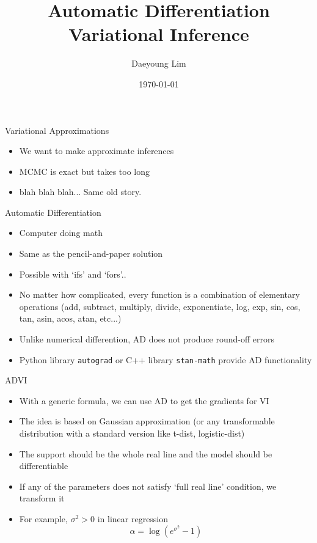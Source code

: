 \documentclass[color=usernames,dvipsnames]{beamer}
\title{Automatic Differentiation Variational Inference}
\author{Daeyoung Lim}
\institute{Department of Statistics\\Korea University}
\date{\today}
\begin{document}
	\frame{\titlepage}
	\begin{frame}{Variational Approximations}
    \begin{itemize}
      \item<+-> We want to make approximate inferences
      \item<+-> MCMC is exact but takes too long
      \item<+-> blah blah blah... Same old story.
    \end{itemize}
\end{frame}
\begin{frame}{Automatic Differentiation}
  \begin{itemize}
    \item<+-> Computer doing math
    \item<+-> Same as the pencil-and-paper solution
    \item<+-> Possible with `ifs' and `fors'..
    \item<+-> No matter how complicated, every function is a combination of elementary operations (add, subtract, multiply, divide, exponentiate, log, exp, sin, cos, tan, asin, acos, atan, etc...)
    \item<+-> Unlike numerical differention, AD does not produce round-off errors
    \item<+-> Python library \texttt{autograd} or C++ library \texttt{stan-math} provide AD functionality
  \end{itemize}
\end{frame}
\begin{frame}{ADVI}
  \begin{itemize}
    \item<+-> With a generic formula, we can use AD to get the gradients for VI
    \item<+-> The idea is based on Gaussian approximation (or any transformable distribution with a standard version like t-dist, logistic-dist)
    \item<+-> The support should be the whole real line and the model should be differentiable
    \item<+-> If any of the parameters does not satisfy `full real line' condition, we transform it
    \item<+-> For example, $\sigma^{2}>0$ in linear regression
    \begin{equation}
      \alpha = \log\left(e^{\sigma^{2}}-1\right)
    \end{equation}
  \end{itemize}
\end{frame}
\end{document}
